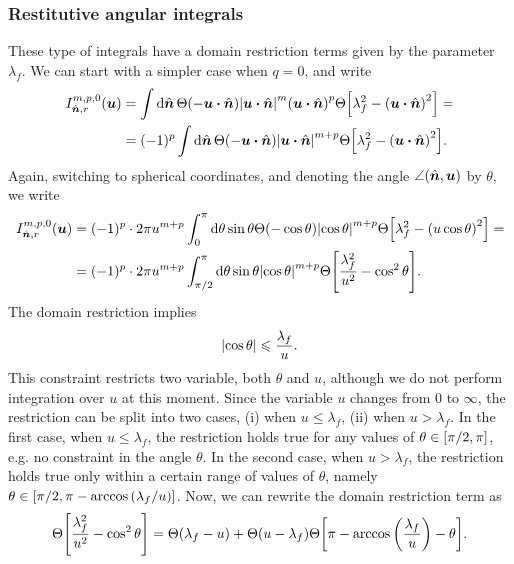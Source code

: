 \documentclass[aps,prl,preprint,groupedaddress,10pt]{revtex4-2}
\begin{document}
\subsubsection{Restitutive angular integrals}
These type of integrals have a domain restriction terms given by the parameter $\lambda_f$.
We can start with a simpler case when $q=0$, and write
\begin{equation}
    \begin{split}
        I_{\bn,r}^{m,p,0}(\bu)&=\int\dd{\bn}\Theta\pqty{-\bu\vdot\bn}
        \abs{\bu\vdot\bn}^m\pqty{\bu\vdot\bn}^p
        \Theta\bqty{\lambda_f^2-\pqty{\bu\vdot\bn}^2}=\\
        &=(-1)^p\int\dd{\bn}\Theta\pqty{-\bu\vdot\bn}
        \abs{\bu\vdot\bn}^{m+p}
        \Theta\bqty{\lambda_f^2-\pqty{\bu\vdot\bn}^2}.
    \end{split}
\end{equation}
Again, switching to spherical coordinates, and denoting the angle $\angle(\hat{\vb*{n}},\vb*{u})$ by
$\theta$, we write
\begin{equation}
    \begin{split}
        I_{\bn,r}^{m,p,0}(\bu)&=(-1)^p\cdot 2\pi u^{m+p}\int_0^{\pi}\dd{\theta}\sin\theta
        \Theta\pqty{-\cos\theta}\abs{\cos\theta}^{m+p}
        \Theta\bqty{\lambda_f^2-\pqty{u\cos\theta}^2}=\\
        &=(-1)^p\cdot 2\pi u^{m+p}\int_{\pi/2}^{\pi}\dd{\theta}\sin\theta
        \abs{\cos\theta}^{m+p}\Theta\bqty{\frac{\lambda_f^2}{u^2}-\cos^2\theta}.
    \end{split}
\end{equation}
The domain restriction implies
\begin{equation}
    \abs{\cos\theta}\leqslant\frac{\lambda_f}{u}.
\end{equation}
This constraint restricts two variable, both $\theta$ and $u$, although we do not perform
integration over $u$ at this moment. Since the variable $u$ changes from $0$ to $\infty$,
the restriction can be split into two cases, (i) when $u\leqslant\lambda_f$, (ii) when
$u>\lambda_f$. In the first case, when $u\leqslant\lambda_f$, the restriction holds true
for any values of $\theta\in\bqty{\pi/2,\pi}$, e.g. no constraint in the angle $\theta$.
In the second case, when $u>\lambda_f$, the restriction holds true only within a certain
range of values of $\theta$, namely $\theta\in\bqty{\pi/2,\pi-\arccos\pqty{\lambda_f/u}}$.
Now, we can rewrite the domain restriction term as
\begin{equation}
    \Theta\bqty{\frac{\lambda_f^2}{u^2}-\cos^2\theta}=
    \Theta\pqty{\lambda_f-u}+\Theta\pqty{u-\lambda_f}
    \Theta\bqty{\pi-\arccos\pqty{\frac{\lambda_f}{u}}-\theta}.
\end{equation}
\end{document}
